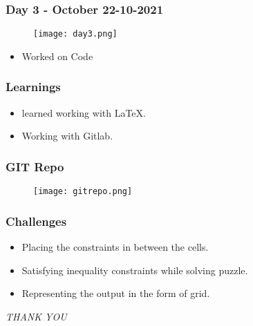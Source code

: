 \documentclass[14pt]{beamer}
\begin{document}
\begin{frame}
     \frametitle{Day 3 - October 22-10-2021}
    \begin{figure}
        \texttt{[image: day3.png]}
   \end{figure}
    \begin{itemize}
       \item Worked on Code
   \end{itemize}
\end{frame}
\begin{frame}
  \frametitle{Learnings}
  \begin{itemize}
      \item learned working with LaTeX.
      \item Working with Gitlab.
   \end{itemize}
\end{frame}
\begin{frame}
	\frametitle{GIT Repo}
	 \begin{figure}
       		 \texttt{[image: gitrepo.png]}
   \end{figure}
    \end{frame}
\begin{frame}
  \frametitle{Challenges}
    \begin{itemize}
        \item Placing the constraints in between the cells.
        \item Satisfying inequality constraints while solving puzzle.
        \item Representing the output in the form of grid.
    \end{itemize}
\end{frame}
\begin{frame}
     \centering \Huge
     \emph{THANK YOU}
\end{frame}
 
\end{document}

